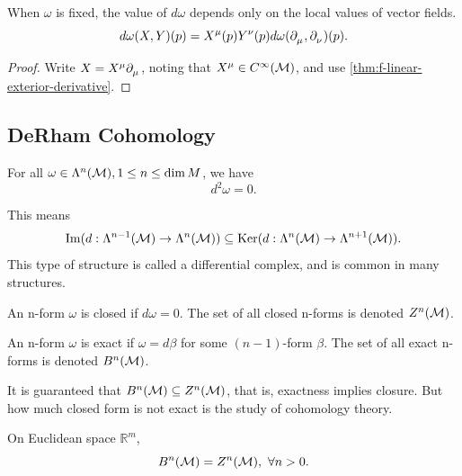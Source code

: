 \documentclass[../main.tex]{subfiles}
\begin{document}
    \begin{corollary}\label{cor:local-exterior-derivative}
        When \(\omega\) is fixed, the value of \(d\omega\) depends only on 
        the local values of vector fields.
        \[
        d\omega(X, Y)(p) = X^\mu(p)Y^\nu(p)d\omega(\tfld{\mu}, \tfld{\nu})(p).
        \]
    \end{corollary}
    \begin{proof}
        Write \(X = X^\mu\tfld{\mu}\), noting that \(X^\mu \in 
        C^\infty(\manifold[M])\), and use \cref{thm:f-linear-exterior-derivative}.
    \end{proof}
    \newpage
    \subsection{DeRham Cohomology}
    \begin{theorem}\label{thm:ddzero}
        For all \(\omega \in \form{n}{M}, 1 \leq n \leq \dim M\), we have 
        \[
        d^2\omega=0.
        \]
    \end{theorem}
    \begin{remark}
        This means 
        \[
        \mathrm{Im}(d : \form{n-1}{M} \to \form{n}{M}) \subseteq 
        \mathrm{Ker}(d : \form{n}{M} \to \form{n+1}{M}).
        \]
        This type of structure is called a differential complex, and is common 
        in many structures.
    \end{remark}
    \begin{definition}\label{def:closed-form}
        An n-form \(\omega\) is closed if \(d\omega=0\). The set of all closed 
        n-forms is denoted \(Z^n(\manifold[M])\).
    \end{definition}
    \begin{definition}\label{def:exact-form}
        An n-form \(\omega\) is exact if \(\omega = d\beta\) for some 
        \((n-1)\)-form \(\beta\). The set of all exact n-forms is denoted 
        \(B^n(\manifold[M])\).
    \end{definition}
    \begin{remark}
        It is guaranteed that \(B^n(\manifold[M]) \subseteq Z^n(\manifold[M])\), 
        that is, exactness implies closure.
        But how much closed form is not exact is the study of cohomology theory.
    \end{remark}
    \begin{theorem}\label{thm:poincare-lemma}
        On Euclidean space \(\mathbb{R}^m\), 
        \[
        B^n(\manifold[M]) = Z^n(\manifold[M]), ~\forall n > 0.
        \]
    \end{theorem}
\end{document}
